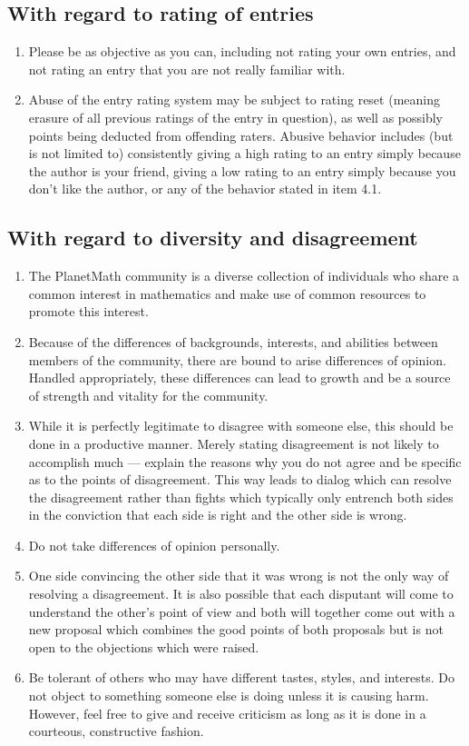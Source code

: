 \subsection*{With regard to rating of entries}
\begin{enumerate}
\item Please be as objective as you can, including not rating your own entries, and not rating an entry that you are not really familiar with.
\item Abuse of the entry rating system may be subject to rating reset (meaning erasure of all previous ratings of the entry in question), as well as possibly points being deducted from offending raters. Abusive behavior includes (but is not limited to) consistently giving a high rating to an entry simply because the author is your friend, giving a low rating to an entry simply because you don't like the author, or any of the behavior stated in item 4.1.
\end{enumerate}

\subsection*{With regard to diversity and disagreement}
\begin{enumerate}
\item The PlanetMath community is a diverse collection of individuals who
share a common interest in mathematics and make use of common
resources to promote this interest.
\item Because of the differences of backgrounds, interests, and abilities
between members of the community, there are bound to arise differences
of opinion. Handled appropriately, these differences can lead to
growth and be a source of strength and vitality for the community.
\item While it is perfectly legitimate to disagree with someone else, this
should be done in a productive manner. Merely stating disagreement is
not likely to accomplish much --- explain the reasons why you do not
agree and be specific as to the points of disagreement. This way
leads to dialog which can resolve the disagreement rather than
fights which typically only entrench both sides in the conviction that
each side is right and the other side is wrong.
\item Do not take differences of opinion personally.
\item One side convincing the other side that it was wrong is not the only
way of resolving a disagreement. It is also possible that each
disputant will come to understand the other's point of view and both
will together come out with a new proposal which combines the good
points of both proposals but is not open to the objections which were
raised.
\item Be tolerant of others who may have different tastes, styles, and
interests. Do not object to something someone else is doing unless it
is causing harm. However, feel free to give and receive criticism as
long as it is done in a courteous, constructive fashion.
\end{enumerate}

